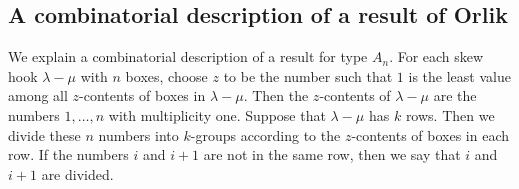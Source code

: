 \documentclass[11pt]{amsart}
\numberwithin{equation}{section}
\theoremstyle{definition}
\begin{document}










\subsection{A combinatorial description of a result of Orlik}

We explain a combinatorial description of a result \cite{orlik2005extensions} for type $A_n$. For each skew hook $\lambda-\mu$ with $n$ boxes, choose $z$ to be the number such that $1$ is the least value among all $z$-contents of boxes in $\lambda-\mu$. Then the $z$-contents of $\lambda-\mu$ are the numbers $1, \ldots, n$ with multiplicity one. Suppose that $\lambda-\mu$ has $k$ rows. Then we divide these $n$ numbers into $k$-groups according to the $z$-contents of boxes in each row. If the numbers $i$ and $i+1$ are not in the same row, then we say that $i$ and $i+1$ are divided. 
\end{document}
